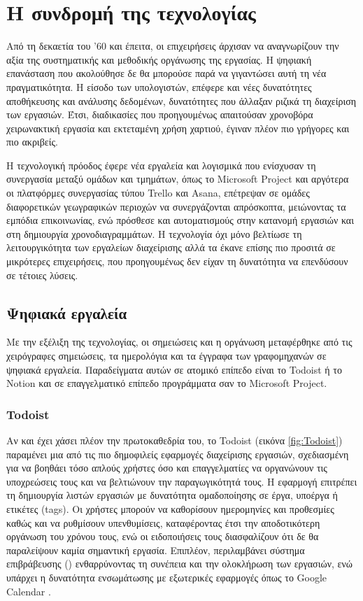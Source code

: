     \section{Η συνδρομή της τεχνολογίας}
        Από τη δεκαετία του '60 και έπειτα, οι επιχειρήσεις άρχισαν να αναγνωρίζουν την αξία της συστηματικής και μεθοδικής οργάνωσης της εργασίας. Η ψηφιακή επανάσταση που ακολούθησε δε θα μπορούσε παρά να γιγαντώσει αυτή τη νέα πραγματικότητα. Η είσοδο των υπολογιστών, επέφερε και νέες δυνατότητες αποθήκευσης και ανάλυσης δεδομένων, δυνατότητες που άλλαξαν ριζικά τη διαχείριση των εργασιών. Έτσι, διαδικασίες που προηγουμένως απαιτούσαν χρονοβόρα χειρωνακτική εργασία και εκτεταμένη χρήση χαρτιού, έγιναν πλέον πιο γρήγορες και πιο ακριβείς.

        Η τεχνολογική πρόοδος έφερε νέα εργαλεία και λογισμικά που ενίσχυσαν τη συνεργασία μεταξύ ομάδων και τμημάτων, όπως το Microsoft Project και αργότερα οι πλατφόρμες συνεργασίας τύπου Trello και Asana, επέτρεψαν σε ομάδες διαφορετικών γεωγραφικών περιοχών να συνεργάζονται απρόσκοπτα, μειώνοντας τα εμπόδια επικοινωνίας, ενώ πρόσθεσε και αυτοματισμούς στην κατανομή εργασιών και στη δημιουργία χρονοδιαγραμμάτων. Η τεχνολογία όχι μόνο βελτίωσε τη λειτουργικότητα των εργαλείων διαχείρισης αλλά τα έκανε επίσης πιο προσιτά σε μικρότερες επιχειρήσεις, που προηγουμένως δεν είχαν τη δυνατότητα να επενδύσουν σε τέτοιες λύσεις.

        \subsection{Ψηφιακά εργαλεία} \label{sec:digitaltools}
            Με την εξέλιξη της τεχνολογίας, οι σημειώσεις και η οργάνωση μεταφέρθηκε από τις χειρόγραφες σημειώσεις, τα ημερολόγια και τα έγγραφα των γραφομηχανών σε  ψηφιακά εργαλεία. Παραδείγματα αυτών σε ατομικό επίπεδο είναι το Todoist ή το Notion και σε επαγγελματικό επίπεδο προγράμματα σαν το Microsoft Project.

            \subsubsection{Todoist}
                Αν και έχει χάσει πλέον την πρωτοκαθεδρία του, το Todoist (εικόνα \ref{fig:Todoist}) παραμένει μια από τις πιο δημοφιλείς εφαρμογές διαχείρισης εργασιών, σχεδιασμένη για να βοηθάει τόσο απλούς χρήστες όσο και επαγγελματίες να οργανώνουν τις υποχρεώσεις τους και να βελτιώνουν την παραγωγικότητά τους. Η εφαρμογή επιτρέπει τη δημιουργία λιστών εργασιών με δυνατότητα ομαδοποίησης σε έργα, υποέργα ή ετικέτες (tags). Οι χρήστες μπορούν να καθορίσουν ημερομηνίες και προθεσμίες καθώς και να ρυθμίσουν υπενθυμίσεις, καταφέροντας έτσι την αποδοτικότερη οργάνωση του χρόνου τους, ενώ οι ειδοποιήσεις τους διασφαλίζουν ότι δε θα παραλείψουν καμία σημαντική εργασία. Επιπλέον, περιλαμβάνει σύστημα επιβράβευσης () ενθαρρύνοντας τη συνέπεια και την ολοκλήρωση των εργασιών, ενώ υπάρχει η δυνατότητα ενσωμάτωσης με εξωτερικές εφαρμογές όπως το Google Calendar \cite{Todoist}.

